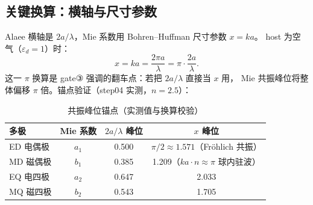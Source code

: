 \subsection{关键换算：横轴与尺寸参数}

Alaee 横轴是 \textbf{$2a/\lambda$}，Mie 系数用 Bohren--Huffman 尺寸参数 $x=ka$。
host 为空气（$\varepsilon_d=1$）时：
\begin{equation}
  x = ka = \frac{2\pi a}{\lambda} = \pi\cdot\frac{2a}{\lambda}.
  \label{eq:xconv}
\end{equation}
这一 $\pi$ 换算是 gate③ 强调的翻车点：若把 $2a/\lambda$ 直接当 $x$ 用，
Mie 共振峰位将整体偏移 $\pi$ 倍。锚点验证（step04 实测，$n=2.5$）：

\begin{table}[H]
\centering
\caption{共振峰位锚点（实测值与换算校验）}
\begin{tabular}{lccc}
\toprule
\textbf{多极} & \textbf{Mie 系数} & \textbf{$2a/\lambda$ 峰位} & \textbf{$x$ 峰位} \\
\midrule
ED 电偶极 & $a_1$ & 0.500 & $\pi/2\approx1.571$（Fröhlich 共振） \\
MD 磁偶极 & $b_1$ & 0.385 & 1.209（$ka\cdot n\approx\pi$ 球内驻波） \\
EQ 电四极 & $a_2$ & 0.647 & 2.033 \\
MQ 磁四极 & $b_2$ & 0.543 & 1.705 \\
\bottomrule
\end{tabular}
\end{table}
